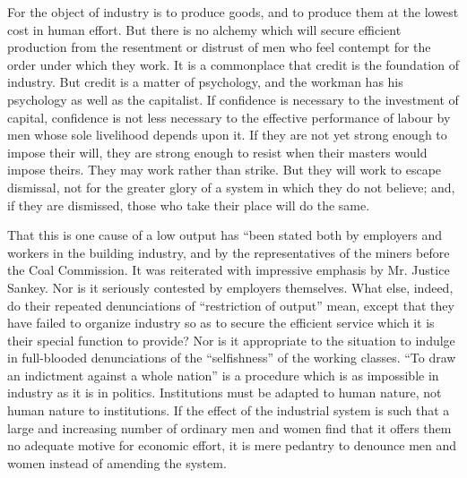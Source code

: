 \documentclass{book}
\begin{document}
For the object of industry is to produce goods, and to produce them at the lowest cost in human effort. But there is no alchemy which will secure efficient production from the resentment or distrust of men who feel contempt for the order under which they work. It is a commonplace that credit is the foundation of industry. But credit is a matter of psychology, and the workman has his psychology as well as the capitalist. If confidence is necessary to the investment of capital, confidence is not less necessary to the effective performance of labour by men whose sole livelihood depends upon it. If they are not yet strong enough to impose their will, they are strong enough to resist when their masters would impose theirs. They may work rather than strike. But they will work to escape dismissal, not for the greater glory of a system in which they do not believe; and, if they are dismissed, those who take their place will do the same.

That this is one cause of a low output has “been stated both by employers and workers in the building industry, and by the representatives of the miners before the Coal Commission. It was reiterated with impressive emphasis by Mr. Justice Sankey. Nor is it seriously contested by employers themselves. What else, indeed, do their repeated denunciations of “restriction of output” mean, except that they have failed to organize industry so as to secure the efficient service which it is their special function to provide? Nor is it appropriate to the situation to indulge in full-blooded denunciations of the “selfishness” of the working classes. “To draw an indictment against a whole nation” is a procedure which is as impossible in industry as it is in politics. Institutions must be adapted to human nature, not human nature to institutions. If the effect of the industrial system is such that a large and increasing number of ordinary men and women find that it offers them no adequate motive for economic effort, it is mere pedantry to denounce men and women instead of amending the system.
\end{document}
